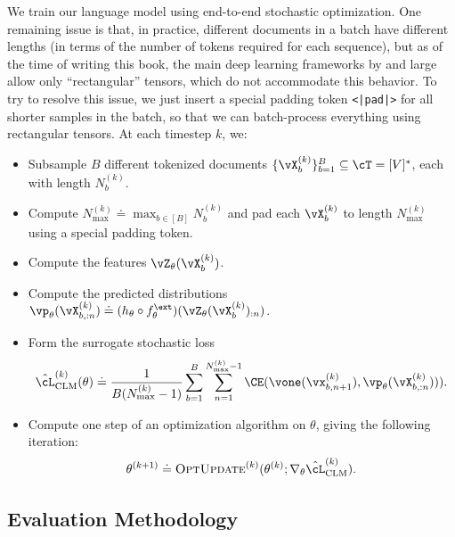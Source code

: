 \documentclass[../../book-main.tex]{subfiles}
\begin{document}
We train our language model using end-to-end stochastic optimization.
One remaining issue is that, in practice, different documents in a
batch have different lengths (in terms of the number of tokens
required for each sequence), but as of the time of writing this book,
the main deep learning frameworks by and large allow only
``rectangular'' tensors, which do not accommodate this behavior. To
try to resolve this issue, we just insert a special padding token
\texttt{<|pad|>} for all shorter samples in the batch, so that we can
batch-process everything using rectangular tensors. At each timestep \(k\), we:
\begin{itemize}
\item Subsample \(B\) different tokenized documents
\(\{\vX_{b}^{(k)}\}_{b = 1}^{B} \subseteq \cT = [V]^{*}\), each
with length \(N_{b}^{(k)}\).
\item Compute \(N_{\max}^{(k)} \doteq \max_{b \in [B]}N_{b}^{(k)}\)
and pad each \(\vX_{b}^{(k)}\) to length \(N_{\max}^{(k)}\) using
a special padding token.
\item Compute the features \(\vZ_{\theta}(\vX_{b}^{(k)})\).
\item Compute the predicted distributions \(\vp_{\theta}(\vX_{b,
    :n}^{(k)}) \doteq (h_{\theta} \circ
f_{\theta}^{\ext})(\vZ_{\theta}(\vX_{b}^{(k)})_{:n})\).
\item Form the surrogate stochastic loss
\begin{equation}
    \hat{\cL}_{\mathrm{CLM}}^{(k)}(\theta) \doteq
    \frac{1}{B(N_{\max}^{(k)} - 1)}\sum_{b = 1}^{B}\sum_{n =
    1}^{N_{\max}^{(k)}-1}\CE(\vone(\vx_{b, n + 1}^{(k)}),
\vp_{\theta}(\vX_{b, :n}^{(k)}))).
\end{equation}
\item Compute one step of an optimization algorithm on \(\theta\),
giving the following iteration:
\begin{equation}
\theta^{(k + 1)} \doteq \textsc{OptUpdate}^{(k)}(\theta^{(k)};
\nabla_{\theta}\hat{\cL}_{\mathrm{CLM}}^{(k)}).
\end{equation}
\end{itemize}

\subsection{Evaluation Methodology} \label{sub:clm_text_evals}
\end{document}

